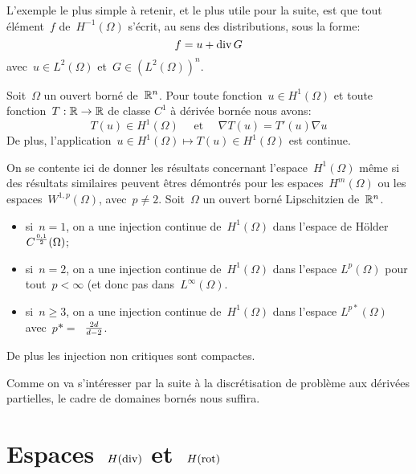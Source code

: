 \bigskip
L'exemple le plus simple à retenir, et le plus utile pour la suite, est que tout élément~$f$ de~$H^{-1}(\Omega)$ s'écrit, au sens des distributions, sous la forme:
\begin{equation}\colorred
f = u + \dive G
\end{equation}
avec~$u \in L^2(\Omega)$ et~$G \in (L^2(\Omega))^n$.
\medskip
\begin{theoreme}
Soit~$\Omega$ un ouvert borné de~$\mathbb R^n$.
Pour toute fonction~$u \in H^1(\Omega)$ et toute fonction~$T: \mathbb R \to \mathbb R$ de classe $C^1$ à dérivée bornée nous avons:
\begin{equation}
T(u) \in H^1(\Omega)\quad\text{ et }\quad\nabla T(u) = T'(u)\nabla u
\end{equation}
De plus, l'application~$u \in H^1(\Omega) \mapsto T(u) \in H^1(\Omega)$ est continue.
\end{theoreme}
\medskip
On se contente ici de donner les résultats concernant l'espace~$H^1(\Omega)$ même si des résultats similaires peuvent êtres démontrés pour les espaces~$H^m(\Omega)$ ou les espaces~$W^{1,p}(\Omega)$, avec~$p\ne 2$.
Soit~$\Omega$ un ouvert borné Lipschitzien de~$\mathbb R^n$.
\begin{itemize}
  \item si~$n=1$, on a une injection continue de~$H^1(\Omega)$ dans l'espace de Hölder~$C^{0,1\over2}(\Omega)$;
  \item si~$n=2$, on a une injection continue de~$H^1(\Omega)$ dans l'espace $L^p(\Omega)$ pour tout~$p<\infty$ (et donc pas dans~$L^\infty(\Omega)$.
  \item si~$n\ge 3$, on a une injection continue de~$H^1(\Omega)$ dans l'espace $L^{p*}(\Omega)$ avec~$p*=$~${2d}\over{d-2}$.
\end{itemize}
De plus les injection non critiques sont compactes.

Comme on va s'intéresser par la suite à la discrétisation de problème aux dérivées partielles, le cadre de domaines bornés nous suffira.

\medskip\ifVersionDuDocEstVincent\else\newpage\fi
\section{Espaces~$H(\operatorname{div})$ et~$H(\operatorname{rot})$}

